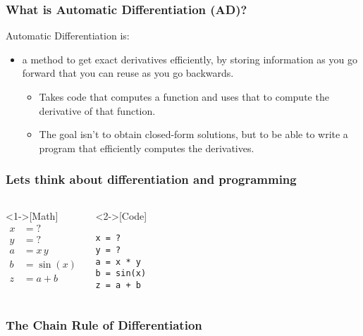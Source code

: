 \documentclass[\beamerclass]{beamer}
\begin{document}
\begin{frame}
	\frametitle{What is Automatic Differentiation (AD)?}

	Automatic Differentiation is:
	\begin{itemize}
		\item a method to get exact derivatives efficiently, by storing information as you go forward that you can reuse as you go backwards.
		\begin{itemize}
			\item Takes code that computes a function and uses that to compute the derivative of that function.
		\item The goal isn't to obtain closed-form solutions, but to be able to write a program that efficiently computes the derivatives.
		\end{itemize}
	\end{itemize}
\end{frame}

\begin{frame}[fragile]
\frametitle{Lets think about differentiation and programming}
\begin{columns}
    \begin{example}<1->[Math] 
    \vspace{-1.5em}
    \begin{align*}
			x & = ? \\
			y & = ? \\
			a & = x \, y \\
			b & = \sin(x) \\
			z & = a + b
		\end{align*}
    \end{example}

	\begin{example}<2->[Code]
			\begin{lstlisting}
x = ?
y = ?
a = x * y
b = sin(x)
z = a + b
			\end{lstlisting}
	\end{example}
	\end{columns}
\end{frame}

\begin{frame}
\frametitle{The Chain Rule of Differentiation}


\end{frame}
\end{document}
